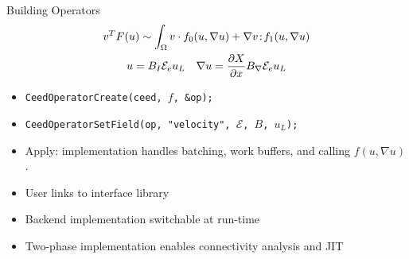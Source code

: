 \documentclass[aspectratio=1610]{beamer}
\begin{document}
\begin{frame}{Building Operators}
  \begin{gather*}
    v^T F(u) \sim \int_\Omega v \cdot f_0(u, \nabla u) + \nabla v 
    \!:\! f_1(u, \nabla u) \\
    u = B_I \mathcal E_e u_L \quad \nabla u = \frac{\partial X}{\partial x} B_{\nabla} \mathcal E_e u_L
  \end{gather*}
  \begin{itemize}
  \item \texttt{CeedOperatorCreate(ceed, $f$, \&op);}
  \item \texttt{CeedOperatorSetField(op, "velocity", $\mathcal E$, $B$, $u_{L}$);}
  \item Apply: implementation handles batching, work buffers, and calling $f(u, \nabla u)$.
  \item User links to interface library
  \item Backend implementation switchable at run-time
  \item Two-phase implementation enables connectivity analysis and JIT
  \end{itemize}
\end{frame}
\end{document}
